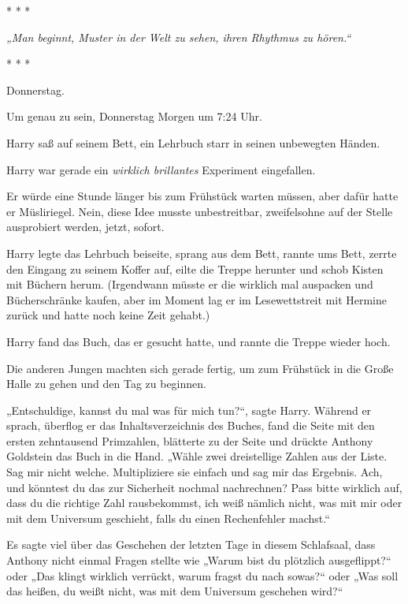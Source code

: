 

\hypertarget{die-bevorzugte-hypothese}{%

* * *

\hfill\break \emph{„Man beginnt, Muster in der Welt zu sehen, ihren Rhythmus zu hören.“}

* * *

Donnerstag.

Um genau zu sein, Donnerstag Morgen um 7:24 Uhr.

Harry saß auf seinem Bett, ein Lehrbuch starr in seinen unbewegten Händen.

Harry war gerade ein \emph{wirklich brillantes} Experiment eingefallen.

Er würde eine Stunde länger bis zum Frühstück warten müssen, aber dafür hatte er Müsliriegel. Nein, diese Idee musste unbestreitbar, zweifelsohne auf der Stelle ausprobiert werden, jetzt, sofort.

Harry legte das Lehrbuch beiseite, sprang aus dem Bett, rannte ums Bett, zerrte den Eingang zu seinem Koffer auf, eilte die Treppe herunter und schob Kisten mit Büchern herum. (Irgendwann müsste er die wirklich mal auspacken und Bücherschränke kaufen, aber im Moment lag er im Lesewettstreit mit Hermine zurück und hatte noch keine Zeit gehabt.)

Harry fand das Buch, das er gesucht hatte, und rannte die Treppe wieder hoch.

Die anderen Jungen machten sich gerade fertig, um zum Frühstück in die Große Halle zu gehen und den Tag zu beginnen.

„Entschuldige, kannst du mal was für mich tun?“, sagte Harry. Während er sprach, überflog er das Inhaltsverzeichnis des Buches, fand die Seite mit den ersten zehntausend Primzahlen, blätterte zu der Seite und drückte Anthony Goldstein das Buch in die Hand. „Wähle zwei dreistellige Zahlen aus der Liste. Sag mir nicht welche. Multipliziere sie einfach und sag mir das Ergebnis. Ach, und könntest du das zur Sicherheit nochmal nachrechnen? Pass bitte wirklich auf, dass du die richtige Zahl rausbekommst, ich weiß nämlich nicht, was mit mir oder mit dem Universum geschieht, falls du einen Rechenfehler machst.“

Es sagte viel über das Geschehen der letzten Tage in diesem Schlafsaal, dass Anthony nicht einmal Fragen stellte wie „Warum bist du plötzlich ausgeflippt?“ oder „Das klingt wirklich verrückt, warum fragst du nach sowas?“ oder „Was soll das heißen, du weißt nicht, was mit dem Universum geschehen wird?“

}
